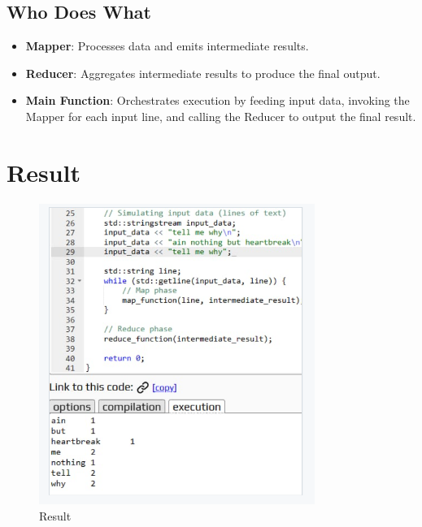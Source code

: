 \documentclass{article}
\begin{document}
\subsection{Who Does What}
\begin{itemize}
    \item \textbf{Mapper}: Processes data and emits intermediate results.
    \item \textbf{Reducer}: Aggregates intermediate results to produce the final output.
    \item \textbf{Main Function}: Orchestrates execution by feeding input data, invoking the Mapper for each input line, and calling the Reducer to output the final result.
\end{itemize}

\section{Result}

\begin{figure}[h]
    \centering
    \includegraphics[width=0.8\textwidth]{wordcount.png} 
    \caption{Result}
    \label{fig:output}
\end{figure}
\end{document}
